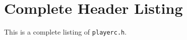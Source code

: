 \documentclass[11pt]{report}
\begin{document}
\newpage


\newpage


\newpage


%

\newpage


\newpage


\newpage


\newpage


\newpage


\newpage


\newpage


\newpage




\appendix

\chapter{Complete Header Listing}

This is a complete listing of {\tt playerc.h}.


\end{document}
